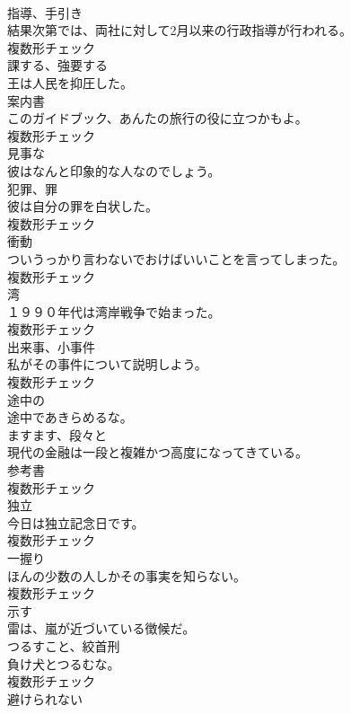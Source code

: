 \documentclass[8pt]{extreport}
\begin{document}
\begin{CJK}{UTF8}{min}
\\	[名詞]	指導、手引き	
\\	結果次第では、両社に対して2月以来の行政指導が行われる。	
\\	複数形チェック
\\	[動詞]	課する、強要する	
\\	王は人民を抑圧した。	
\\	[名詞]	案内書	
\\	このガイドブック、あんたの旅行の役に立つかもよ。	
\\	複数形チェック
\\	[形容詞]	見事な	
\\	彼はなんと印象的な人なのでしょう。	
\\	[名詞]	犯罪、罪	
\\	彼は自分の罪を白状した。	
\\	複数形チェック
\\	[名詞]	衝動	
\\	ついうっかり言わないでおけばいいことを言ってしまった。	
\\	複数形チェック
\\	[名詞]	湾	
\\	１９９０年代は湾岸戦争で始まった。	
\\	複数形チェック
\\	[名詞]	出来事、小事件	
\\	私がその事件について説明しよう。	
\\	複数形チェック
\\	[副詞]	途中の	
\\	途中であきらめるな。	
\\	[副詞]	ますます、段々と	
\\	現代の金融は一段と複雑かつ高度になってきている。	
\\	[名詞]	参考書	
\\	複数形チェック
\\	[名詞]	独立	
\\	今日は独立記念日です。	
\\	複数形チェック
\\	[名詞]	一握り	
\\	ほんの少数の人しかその事実を知らない。	
\\	複数形チェック
\\	[動詞]	示す	
\\	雷は、嵐が近づいている徴候だ。	
\\	[名詞]	つるすこと、絞首刑	
\\	負け犬とつるむな。	
\\	複数形チェック
\\	[形容詞]	避けられない	

\end{CJK}
\end{document}
